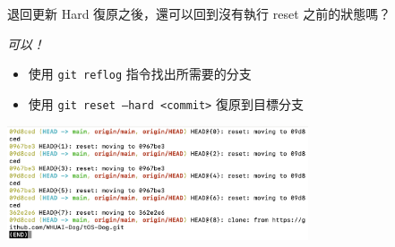 \documentclass[xetex, unicode, 10pt, aspectratio=169]{beamer}
\begin{document}
\begin{frame}{退回更新}
    Hard 復原之後，還可以回到沒有執行 reset 之前的狀態嗎？
    \pause

    \emph{可以！}
    \begin{itemize}
        \item 使用 \texttt{git reflog} 指令找出所需要的分支
        \item 使用 \texttt{git reset --hard <commit>} 復原到目標分支
    \end{itemize}

    \begin{center}
        \includegraphics[width=3.5in]{./img/git-reflog.png}
    \end{center}
\end{frame}
\end{document}
